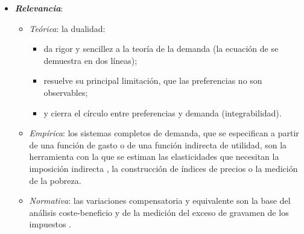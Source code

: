 \documentclass[11pt]{article}
\begin{document}
\begin{itemize}
\item \textbf{\emph{Relevancia}}:
  \begin{itemize}
  \item \emph{Teórica}: la dualidad:
    \begin{itemize}
    \item da rigor y sencillez a la teoría de la demanda (la ecuación de  se demuestra en dos líneas);
    \item resuelve su principal limitación, que las preferencias no son observables;
    \item y cierra el círculo entre preferencias y demanda (integrabilidad).
    \end{itemize}
  \item \emph{Empírica}: los sistemas completos de demanda, que se especifican a partir de una función de gasto o de una función indirecta de utilidad, son la herramienta con la que se estiman las elasticidades que necesitan la imposición indirecta , la construcción de índices de precios  o la medición de la pobreza.
  \item \emph{Normativa}: las variaciones compensatoria y equivalente son la base del análisis coste-beneficio  y de la medición del exceso de gravamen de los impuestos .
  \end{itemize}


\end{itemize}
\end{document}
